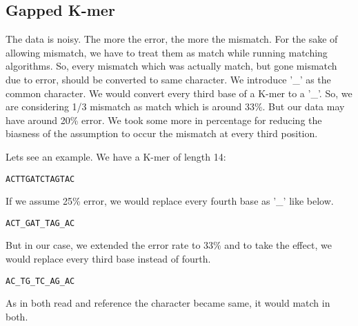 \documentclass{standalone}
\begin{document}
\subsection{Gapped K-mer}
The data is noisy. The more the error, the more the mismatch. For the sake of allowing mismatch, we have to treat them as match while running matching algorithms. So, every mismatch which was actually match, but gone mismatch due to error, should be converted to same character. We introduce '\_' as the common character. We would convert every third base of a K-mer to a '\_'. So, we are considering 1/3 mismatch as match which is around 33\%. But our data may have around 20\% error. We took some more in percentage for reducing the biasness of the assumption to occur the mismatch at every third position.

Lets see an example. We have a K-mer of length 14:
\begin{verbatim}
ACTTGATCTAGTAC
\end{verbatim}
If we assume 25\% error, we would replace every fourth base as '\_' like below.
\begin{verbatim}
ACT_GAT_TAG_AC
\end{verbatim}
But in our case, we extended the error rate to 33\% and to take the effect, we would replace every third base instead of fourth. 
\begin{verbatim}
AC_TG_TC_AG_AC
\end{verbatim}
As in both read and reference the character became same, it would match in both. 
\end{document}
